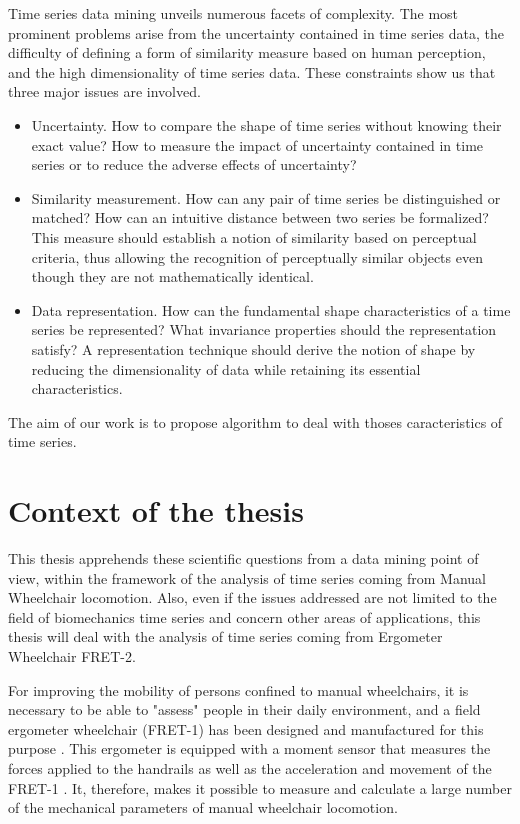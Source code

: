 Time series data mining unveils numerous facets of complexity. The most prominent
problems arise from the uncertainty contained in time series data,  the difficulty of
defining a form of similarity measure based on human perception, and the high dimensionality of time series data. These constraints show us that three major issues are involved.


\begin{itemize}
\item Uncertainty. How to compare the shape of time series without knowing their exact value? How to measure the impact of uncertainty contained in time series or to reduce the adverse effects of uncertainty? 
\item Similarity measurement. How can any pair of time series be distinguished or
matched? How can an intuitive distance between two series be formalized? This
measure should establish a notion of similarity based on perceptual criteria, thus
allowing the recognition of perceptually similar objects even though they are not
mathematically identical.  
\item Data representation. How can the fundamental shape characteristics of a time series
be represented? What invariance properties should the representation satisfy? A
representation technique should derive the notion of shape by reducing the dimensionality
of data while retaining its essential characteristics.
\end{itemize}

The aim of our work is to propose algorithm to deal with thoses caracteristics of time series.

\section*{Context of the thesis}
This thesis apprehends these scientific questions from a data mining point of view, within the framework of the analysis of time series coming from Manual Wheelchair locomotion. Also, even if the issues addressed are not limited to the field of biomechanics time series and concern other areas of applications, this thesis will deal with the analysis of time series coming from Ergometer Wheelchair FRET-2.


For improving the mobility of persons confined to manual wheelchairs, it is necessary to be able to "assess" people in their daily environment, and a field ergometer wheelchair (FRET-1) has been designed and manufactured for this purpose \cite{dabonneville2005self}. This ergometer is equipped with a moment sensor that measures the forces applied to the handrails as well as the acceleration and movement of the FRET-1 \cite{couetard2000}. It, therefore, makes it possible to measure and calculate a large number of the mechanical parameters of manual wheelchair locomotion.



